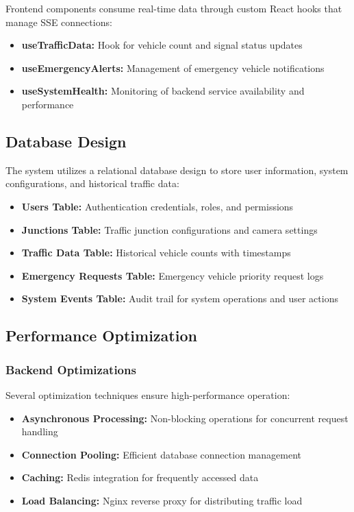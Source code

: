 \documentclass[conference]{IEEEtran}
\begin{document}
Frontend components consume real-time data through custom React hooks that manage SSE connections:

\begin{itemize}
\item \textbf{useTrafficData:} Hook for vehicle count and signal status updates
\item \textbf{useEmergencyAlerts:} Management of emergency vehicle notifications
\item \textbf{useSystemHealth:} Monitoring of backend service availability and performance
\end{itemize}

\subsection{Database Design}

The system utilizes a relational database design to store user information, system configurations, and historical traffic data:

\begin{itemize}
\item \textbf{Users Table:} Authentication credentials, roles, and permissions
\item \textbf{Junctions Table:} Traffic junction configurations and camera settings
\item \textbf{Traffic Data Table:} Historical vehicle counts with timestamps
\item \textbf{Emergency Requests Table:} Emergency vehicle priority request logs
\item \textbf{System Events Table:} Audit trail for system operations and user actions
\end{itemize}

\subsection{Performance Optimization}

\subsubsection{Backend Optimizations}

Several optimization techniques ensure high-performance operation:

\begin{itemize}
\item \textbf{Asynchronous Processing:} Non-blocking operations for concurrent request handling
\item \textbf{Connection Pooling:} Efficient database connection management
\item \textbf{Caching:} Redis integration for frequently accessed data
\item \textbf{Load Balancing:} Nginx reverse proxy for distributing traffic load
\end{itemize}
\end{document}
